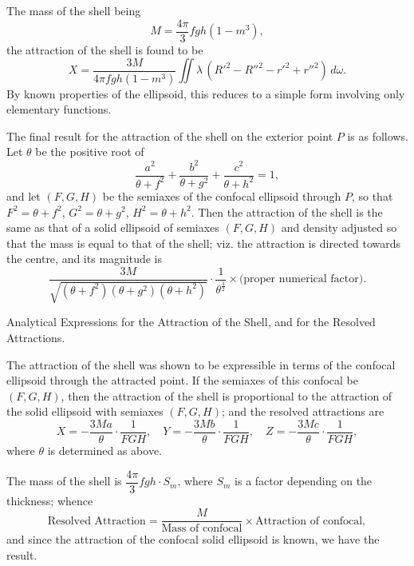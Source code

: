 \documentclass[11pt,a4paper]{book}
\begin{document}
\begin{art}
The mass of the shell being
\[
M = \frac{4\pi}{3}fgh(1 - m^3),
\]
the attraction of the shell is found to be
\[
X = \frac{3M}{4\pi fgh(1-m^3)} \iint \lambda\,(R'^2 - R''^2 - r'^2 + r''^2)\,d\omega.
\]
By known properties of the ellipsoid, this reduces to a simple form involving only elementary functions.
\end{art}

\begin{art}
The final result for the attraction of the shell on the exterior point $P$ is as follows. Let $\theta$ be the positive root of
\[
\frac{a^2}{\theta + f^2} + \frac{b^2}{\theta + g^2} + \frac{c^2}{\theta + h^2} = 1,
\]
and let $(F, G, H)$ be the semiaxes of the confocal ellipsoid through $P$, so that $F^2 = \theta + f^2$, $G^2 = \theta + g^2$, $H^2 = \theta + h^2$. Then the attraction of the shell is the same as that of a solid ellipsoid of semiaxes $(F, G, H)$ and density adjusted so that the mass is equal to that of the shell; viz. the attraction is directed towards the centre, and its magnitude is
\[
\frac{3M}{\sqrt{(\theta+f^2)(\theta+g^2)(\theta+h^2)}} \cdot \frac{1}{\theta^{\frac{3}{2}}}
\times \text{(proper numerical factor)}.
\]
\end{art}

\begin{art}
Analytical Expressions for the Attraction of the Shell, and for the Resolved Attractions.
\end{art}

\begin{art}
The attraction of the shell was shown to be expressible in terms of the confocal ellipsoid through the attracted point. If the semiaxes of this confocal be $(F, G, H)$, then the attraction of the shell is proportional to the attraction of the solid ellipsoid with semiaxes $(F, G, H)$; and the resolved attractions are
\[
X = -\frac{3Ma}{\theta}\cdot\frac{1}{F G H},\quad
Y = -\frac{3Mb}{\theta}\cdot\frac{1}{F G H},\quad
Z = -\frac{3Mc}{\theta}\cdot\frac{1}{F G H},
\]
where $\theta$ is determined as above.
\end{art}

\begin{art}
The mass of the shell is $\dfrac{4\pi}{3}fgh \cdot S_m$, where $S_m$ is a factor depending on the thickness; whence
\[
\text{Resolved Attraction} = \frac{M}{\text{Mass of confocal}} \times \text{Attraction of confocal},
\]
and since the attraction of the confocal solid ellipsoid is known, we have the result.
\end{art}
\end{document}
